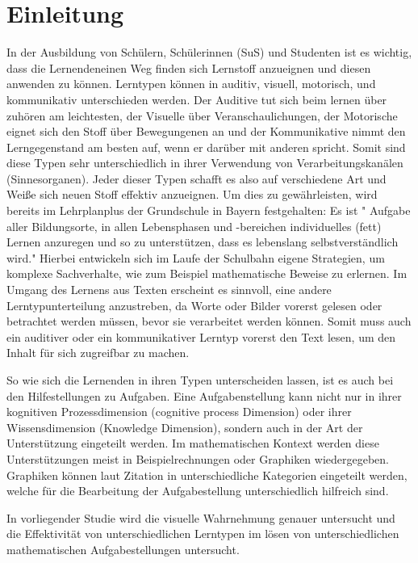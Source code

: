 \chapter{Einleitung}

In der Ausbildung von Schülern, Schülerinnen (SuS) und Studenten ist es wichtig, dass die Lernendeneinen Weg finden sich Lernstoff anzueignen und diesen anwenden zu können. Lerntypen können in auditiv, visuell, motorisch, und kommunikativ unterschieden werden. Der Auditive tut sich beim lernen über zuhören am leichtesten, der Visuelle über Veranschaulichungen, der Motorische eignet sich den Stoff über Bewegungenen an und der Kommunikative nimmt den Lerngegenstand am besten auf, wenn er darüber mit anderen spricht.  Somit sind diese Typen sehr unterschiedlich in ihrer Verwendung von Verarbeitungskanälen (Sinnesorganen).
Jeder dieser Typen schafft es also auf verschiedene Art und Weiße sich neuen Stoff effektiv anzueignen.
Um dies zu gewährleisten, wird bereits im Lehrplanplus der Grundschule in Bayern festgehalten:
Es ist " Aufgabe aller Bildungsorte, in allen Lebensphasen und -bereichen individuelles (fett)
Lernen anzuregen und so zu unterstützen, dass es lebenslang selbstverständlich wird."
\cite{LehrplanGrundschule}
Hierbei entwickeln sich im Laufe der Schulbahn eigene Strategien, um komplexe Sachverhalte,
wie zum Beispiel mathematische Beweise zu erlernen. 
Im Umgang des Lernens aus Texten erscheint es sinnvoll, eine andere Lerntypunterteilung anzustreben, da Worte oder Bilder vorerst gelesen oder betrachtet werden müssen, bevor sie verarbeitet werden können. Somit muss auch ein auditiver oder ein kommunikativer Lerntyp vorerst den Text lesen, um den Inhalt für sich zugreifbar zu machen. 

So wie sich die Lernenden in ihren Typen unterscheiden lassen, ist es auch bei den Hilfestellungen zu Aufgaben. Eine Aufgabenstellung kann nicht nur in ihrer kognitiven Prozessdimension (cognitive process Dimension) oder ihrer Wissensdimension (Knowledge Dimension), sondern auch in der Art der Unterstützung eingeteilt werden. Im mathematischen Kontext werden diese Unterstützungen meist in Beispielrechnungen oder Graphiken wiedergegeben. Graphiken können laut Zitation in unterschiedliche Kategorien eingeteilt werden, welche für die Bearbeitung der Aufgabestellung unterschiedlich hilfreich sind\cite{anderson2001taxonomy}. 

In vorliegender Studie wird die visuelle Wahrnehmung genauer untersucht und die Effektivität von unterschiedlichen Lerntypen im lösen von unterschiedlichen mathematischen Aufgabestellungen untersucht. 